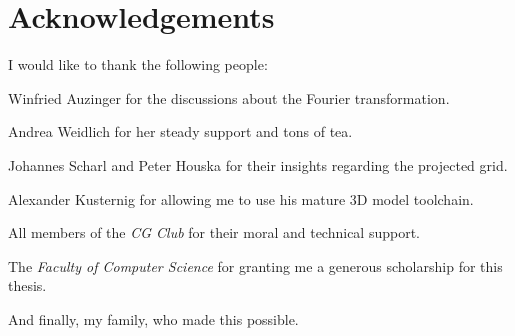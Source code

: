 \chapter*{Acknowledgements}

I would like to thank the following people:\bigskip

Winfried Auzinger for the discussions about the Fourier transformation.\bigskip

Andrea Weidlich for her steady support and tons of tea.\bigskip

Johannes Scharl and Peter Houska for their insights regarding the projected
grid.\bigskip

Alexander Kusternig for allowing me to use his mature 3D model
toolchain.\bigskip

All members of the \textit{CG Club} for their moral and technical
support.\bigskip

The \textit{Faculty of Computer Science} for granting me a generous scholarship
for this thesis.\bigskip

And finally, my family, who made this possible.\bigskip
